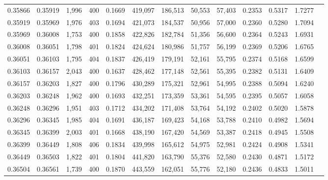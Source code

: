 \begin{tabular}{rrrrrrrrrrrrr}
0.35866 & 0.35919 &  1,996 & 400 &                                     0.1669 & 419,097 & 186,513 &  50,553 &  57,403 & 0.2353 & 0.5317 & 1.7277 \\
0.35919 & 0.35969 &  1,976 & 403 &                                     0.1694 & 421,073 & 184,537 &  50,956 &  57,000 & 0.2360 & 0.5280 & 1.7094 \\
0.35969 & 0.36008 &  1,753 & 400 &                                     0.1858 & 422,826 & 182,784 &  51,356 &  56,600 & 0.2364 & 0.5243 & 1.6931 \\
0.36008 & 0.36051 &  1,798 & 401 &                                     0.1824 & 424,624 & 180,986 &  51,757 &  56,199 & 0.2369 & 0.5206 & 1.6765 \\
0.36051 & 0.36103 &  1,795 & 404 &                                     0.1837 & 426,419 & 179,191 &  52,161 &  55,795 & 0.2374 & 0.5168 & 1.6599 \\
0.36103 & 0.36157 &  2,043 & 400 &                                     0.1637 & 428,462 & 177,148 &  52,561 &  55,395 & 0.2382 & 0.5131 & 1.6409 \\
0.36157 & 0.36203 &  1,827 & 400 &                                     0.1796 & 430,289 & 175,321 &  52,961 &  54,995 & 0.2388 & 0.5094 & 1.6240 \\
0.36203 & 0.36248 &  1,962 & 400 &                                     0.1693 & 432,251 & 173,359 &  53,361 &  54,595 & 0.2395 & 0.5057 & 1.6058 \\
0.36248 & 0.36296 &  1,951 & 403 &                                     0.1712 & 434,202 & 171,408 &  53,764 &  54,192 & 0.2402 & 0.5020 & 1.5878 \\
0.36296 & 0.36345 &  1,985 & 404 &                                     0.1691 & 436,187 & 169,423 &  54,168 &  53,788 & 0.2410 & 0.4982 & 1.5694 \\
0.36345 & 0.36399 &  2,003 & 401 &                                     0.1668 & 438,190 & 167,420 &  54,569 &  53,387 & 0.2418 & 0.4945 & 1.5508 \\
0.36399 & 0.36449 &  1,808 & 406 &                                     0.1834 & 439,998 & 165,612 &  54,975 &  52,981 & 0.2424 & 0.4908 & 1.5341 \\
0.36449 & 0.36503 &  1,822 & 401 &                                     0.1804 & 441,820 & 163,790 &  55,376 &  52,580 & 0.2430 & 0.4871 & 1.5172 \\
0.36504 & 0.36561 &  1,739 & 400 &                                     0.1870 & 443,559 & 162,051 &  55,776 &  52,180 & 0.2436 & 0.4833 & 1.5011 \\

\end{tabular}
